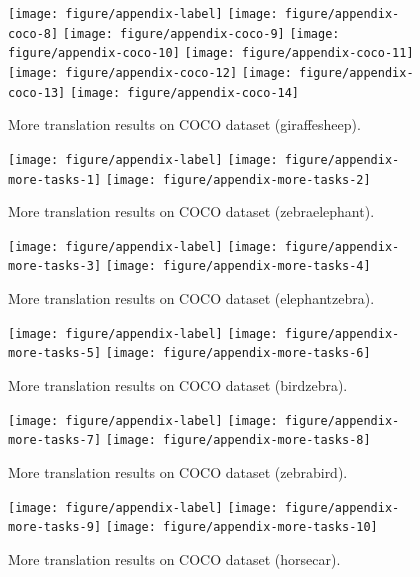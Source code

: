 \documentclass{article} \usepackage{iclr2019_conference,times}
\begin{document}
\begin{figure}[H]
	\centering
	\texttt{[image: figure/appendix-label]}
	\texttt{[image: figure/appendix-coco-8]}
    \texttt{[image: figure/appendix-coco-9]}
    \texttt{[image: figure/appendix-coco-10]}
    \texttt{[image: figure/appendix-coco-11]}
    \texttt{[image: figure/appendix-coco-12]}
    \texttt{[image: figure/appendix-coco-13]}
    \texttt{[image: figure/appendix-coco-14]}
	\caption{
	More translation results on COCO dataset (giraffesheep).
	} \label{fig:more-coco-2}
\end{figure}

\newpage
\begin{figure}[H]
	\centering
	\texttt{[image: figure/appendix-label]}
	\texttt{[image: figure/appendix-more-tasks-1]}
    \texttt{[image: figure/appendix-more-tasks-2]}
	\caption{
	More translation results on COCO dataset (zebraelephant).
	} \label{fig:more-tasks-1}
\end{figure}

\begin{figure}[H]
	\centering
	\texttt{[image: figure/appendix-label]}
	\texttt{[image: figure/appendix-more-tasks-3]}
    \texttt{[image: figure/appendix-more-tasks-4]}
	\caption{
	More translation results on COCO dataset (elephantzebra).
	} \label{fig:more-tasks-2}
\end{figure}

\begin{figure}[H]
	\centering
	\texttt{[image: figure/appendix-label]}
	\texttt{[image: figure/appendix-more-tasks-5]}
    \texttt{[image: figure/appendix-more-tasks-6]}
	\caption{
	More translation results on COCO dataset (birdzebra).
	} \label{fig:more-tasks-3}
\end{figure}

\newpage
\begin{figure}[H]
	\centering
	\texttt{[image: figure/appendix-label]}
	\texttt{[image: figure/appendix-more-tasks-7]}
    \texttt{[image: figure/appendix-more-tasks-8]}
	\caption{
	More translation results on COCO dataset (zebrabird).
	} \label{fig:more-tasks-4}
\end{figure}

\begin{figure}[H]
	\centering
	\texttt{[image: figure/appendix-label]}
	\texttt{[image: figure/appendix-more-tasks-9]}
    \texttt{[image: figure/appendix-more-tasks-10]}
	\caption{
	More translation results on COCO dataset (horsecar).
	} \label{fig:more-tasks-5}
\end{figure}
\end{document}
